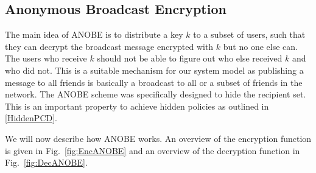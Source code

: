 \subsection{Anonymous Broadcast Encryption}\label{ANOBE}


The main idea of \ac{ANOBE} is to distribute a key \(k\) to a subset of users, 
such that they can decrypt the broadcast message encrypted with \(k\) but no 
one else can.
The users who receive \(k\) should not be able to figure out who else received 
\(k\) and who did not.
This is a suitable mechanism for our system model as publishing a message to 
all friends is basically a broadcast to all or a subset of friends in the 
network.
The \ac{ANOBE} scheme was specifically designed to hide the recipient set.
This is an important property to achieve hidden policies as outlined in 
\cref{HiddenPCD}.

We will now describe how \ac{ANOBE} works.
An overview of the encryption function is given in Fig.~\ref{fig:EncANOBE} and 
an overview of the decryption function in Fig.~\ref{fig:DecANOBE}.

